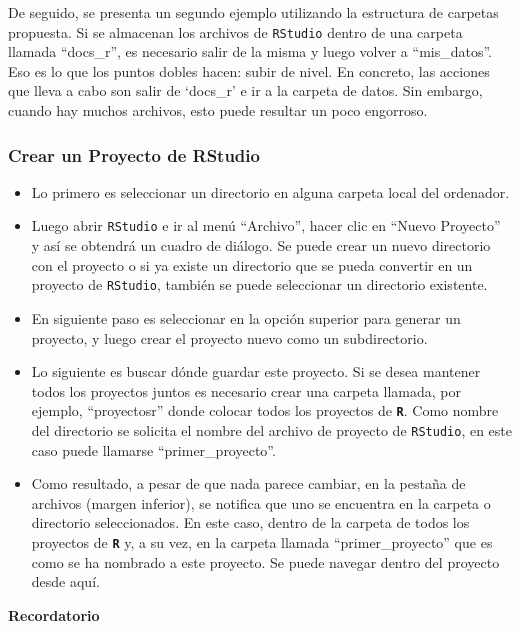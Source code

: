 \documentclass[
]{article}
\begin{document}
De seguido, se presenta un segundo ejemplo utilizando la estructura de carpetas propuesta. Si se almacenan los archivos de \texttt{RStudio} dentro de una carpeta llamada ``docs\_r'', es necesario salir de la misma y luego volver a ``mis\_datos''. Eso es lo que los puntos dobles hacen: subir de nivel. En concreto, las acciones que lleva a cabo son salir de `docs\_r' e ir a la carpeta de datos. Sin embargo, cuando hay muchos archivos, esto puede resultar un poco engorroso.

\hypertarget{crear-un-proyecto-de-rstudio}{%
\subsubsection{Crear un Proyecto de RStudio}\label{crear-un-proyecto-de-rstudio}}

\begin{itemize}
\item
  Lo primero es seleccionar un directorio en alguna carpeta local del ordenador.
\item
  Luego abrir \texttt{RStudio} e ir al menú ``Archivo'', hacer clic en ``Nuevo Proyecto'' y así se obtendrá un cuadro de diálogo. Se puede crear un nuevo directorio con el proyecto o si ya existe un directorio que se pueda convertir en un proyecto de \texttt{RStudio}, también se puede seleccionar un directorio existente.
\item
  En siguiente paso es seleccionar en la opción superior para generar un proyecto, y luego crear el proyecto nuevo como un subdirectorio.
\item
  Lo siguiente es buscar dónde guardar este proyecto. Si se desea mantener todos los proyectos juntos es necesario crear una carpeta llamada, por ejemplo, ``proyectosr'' donde colocar todos los proyectos de \textbf{\texttt{R}}. Como nombre del directorio se solicita el nombre del archivo de proyecto de \texttt{RStudio}, en este caso puede llamarse ``primer\_proyecto''.
\item
  Como resultado, a pesar de que nada parece cambiar, en la pestaña de archivos (margen inferior), se notifica que uno se encuentra en la carpeta o directorio seleccionados. En este caso, dentro de la carpeta de todos los proyectos de \textbf{\texttt{R}} y, a su vez, en la carpeta llamada ``primer\_proyecto'' que es como se ha nombrado a este proyecto. Se puede navegar dentro del proyecto desde aquí.
\end{itemize}

\textbf{Recordatorio}
\end{document}
